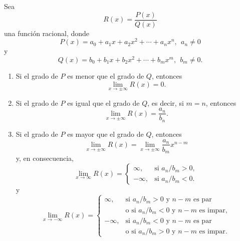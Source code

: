 \documentclass[12pt,a4paper]{book}
\begin{document}
    \begin{proposicion}\label{prop:53}
        Sea
        \begin{equation*}
            R(x)=\frac{P(x)}{Q(x)}
        \end{equation*}
        una función racional, donde
        \begin{equation*}
            P(x)=a_{0}+a_{1}x+a_{2}x^{2}+\cdots+a_{n}x^{n},\ \ a_{n}\neq 0
        \end{equation*}
        y
        \begin{equation*}
            Q(x)=b_{0}+b_{1}x+b_{2}x^{2}+\cdots+b_{m}x^{m},\ \ b_{m}\neq 0.
        \end{equation*}
        \begin{enumerate}
            \item Si el grado de $P$ es menor que el grado de $Q$, entonces
            \begin{equation*}
                \lim_{x\to\pm\infty}R(x)=0.
            \end{equation*}
            \item Si el grado de $P$ es igual que el grado de $Q$, es decir, si $m=n$, entonces
            \begin{equation*}
                \lim_{x\to\pm\infty}R(x)=\frac{a_{n}}{b_{n}}.
            \end{equation*}
            \item Si el grado de $P$ es mayor que el grado de $Q$, entonces
            \begin{equation}\label{eq:4.37}
                \lim_{x\to\pm\infty}R(x)=\lim_{x\to\pm\infty}\frac{a_{n}}{b_{m}}x^{n-m}
            \end{equation}
            y, en consecuencia,
            \begin{equation}\label{eq:4.38}
                \lim_{x\to\infty}R(x)=\begin{cases}
                    \infty, & \text{si }a_{n}/b_{m}>0,\\
                    -\infty, & \text{si }a_{n}/b_{m}<0.
                \end{cases}
            \end{equation}
            y
            \begin{equation}\label{eq:4.39}
                \lim_{x\to-\infty}R(x)=\begin{cases}
                    \infty, & \text{si }a_{n}/b_{m}>0\text{ y }n-m\text{ es par}\\
                    & \text{o si }a_{n}/b_{m}<0\text{ y }n-m\text{ es impar},\\
                    -\infty, & \text{si }a_{n}/b_{m}<0\text{ y }n-m\text{ es par}\\
                    & \text{o si }a_{n}/b_{m}>0\text{ y }n-m\text{ es impar}.
                \end{cases}
            \end{equation}
        \end{enumerate}
    \end{proposicion}
\end{document}
